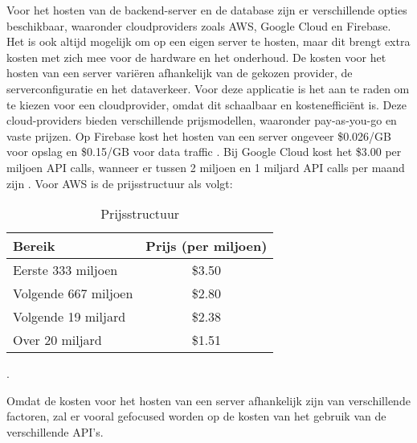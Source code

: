     Voor het hosten van de backend-server en de database zijn er verschillende opties beschikbaar, waaronder cloudproviders zoals AWS, Google Cloud en Firebase.
    Het is ook altijd mogelijk om op een eigen server te hosten, maar dit brengt extra kosten met zich mee voor de hardware en het onderhoud.
    De kosten voor het hosten van een server variëren afhankelijk van de gekozen provider, de serverconfiguratie en het dataverkeer.
    Voor deze applicatie is het aan te raden om te kiezen voor een cloudprovider, omdat dit schaalbaar en kostenefficiënt is.
    Deze cloud-providers bieden verschillende prijsmodellen, waaronder pay-as-you-go en vaste prijzen.
    Op Firebase kost het hosten van een server ongeveer \$0.026/GB voor opslag en \$0.15/GB voor data traffic \textcite{firebase_docs}.
    Bij Google Cloud kost het \$3.00 per miljoen API calls, wanneer er tussen 2 miljoen  en 1 miljard API calls per maand zijn \textcite{google_cloud_docs}.
    Voor AWS is de prijsstructuur als volgt:
    \begin{table}[h]
        \centering
        \begin{tabular}{lc}
        \toprule
        \textbf{Bereik} & \textbf{Prijs (per miljoen)} \\
        \midrule
        Eerste 333 miljoen & \$3.50 \\
        Volgende 667 miljoen & \$2.80 \\
        Volgende 19 miljard & \$2.38 \\
        Over 20 miljard & \$1.51 \\
        \bottomrule
        \end{tabular}
        \caption{Prijsstructuur}
        \label{tab:prijsstructuur}
    \end{table}
    \textcite{aws_docs}.

    Omdat de kosten voor het hosten van een server afhankelijk zijn van verschillende factoren, zal er vooral gefocused worden op de kosten van het gebruik van de verschillende API's.





